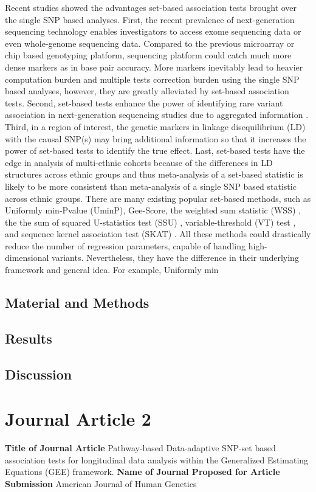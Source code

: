 \documentclass[12pt]{article}
\begin{document}
Recent studies showed the advantages set-based association tests brought over the single SNP based analyses. First, the recent prevalence of next-generation sequencing technology enables investigators to access exome sequencing data or even whole-genome sequencing data. Compared to the previous microarray or chip based genotyping platform, sequencing platform could catch much more dense markers as in base pair accuracy. More markers inevitably lead to heavier computation burden and multiple tests correction burden using the single SNP based analyses, however, they are greatly alleviated by set-based association tests. Second, set-based tests enhance the power of identifying rare variant association in next-generation sequencing studies due to aggregated information \cite{Morris2010}. Third, in a region of interest, the genetic markers in linkage disequilibrium (LD) with the causal SNP(s) may bring additional information so that it increases the power of set-based tests to identify the true effect. Last, set-based tests have the edge in analysis of multi-ethnic cohorts because of the differences in LD structures across ethnic groups and thus meta-analysis of a set-based statistic is likely to be more consistent than meta-analysis of a single SNP based statistic across ethnic groups. There are many existing popular set-based methods, such as Uniformly min-Pvalue (UminP), Gee-Score, the weighted sum statistic (WSS) \cite{Madsen2009}, the the sum of squared U-statistics test (SSU) \cite{Pan2009}, variable-threshold (VT) test \cite{Price2010}, and sequence kernel association test (SKAT) \cite{Wu2011}. All these methods could drastically reduce the number of regression parameters, capable of handling high-dimensional variants. Nevertheless, they have the difference in their underlying framework and general idea. For example, Uniformly min
\subsection*{Material and Methods}
\subsection*{Results}
\subsection*{Discussion}
\section{Journal Article 2}\label{JA_2}
\textbf{Title of Journal Article}
Pathway-based Data-adaptive SNP-set based association tests for longitudinal data analysis within the Generalized Estimating Equations (GEE) framework.
\textbf{Name of Journal Proposed for Article Submission}
American Journal of Human Genetics
\end{document}
